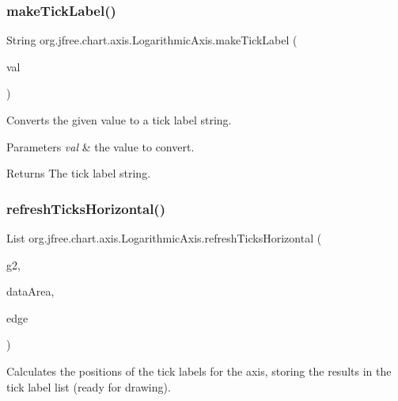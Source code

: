 \subsubsection{\texorpdfstring{make\+Tick\+Label()}{makeTickLabel()}\hspace{0.1cm}{\footnotesize\ttfamily [2/2]}}
{\footnotesize\ttfamily String org.\+jfree.\+chart.\+axis.\+Logarithmic\+Axis.\+make\+Tick\+Label (\begin{DoxyParamCaption}\item[{double}]{val }\end{DoxyParamCaption})\hspace{0.3cm}{\ttfamily [protected]}}

Converts the given value to a tick label string. 
\begin{DoxyParams}{Parameters}
{\em val} & the value to convert.\\
\hline
\end{DoxyParams}
\begin{DoxyReturn}{Returns}
The tick label string. 
\end{DoxyReturn}
\mbox{\label{classorg_1_1jfree_1_1chart_1_1axis_1_1_logarithmic_axis_ab66482bd3e0e85dc1438d309475db9d8}} 
\subsubsection{\texorpdfstring{refresh\+Ticks\+Horizontal()}{refreshTicksHorizontal()}}
{\footnotesize\ttfamily List org.\+jfree.\+chart.\+axis.\+Logarithmic\+Axis.\+refresh\+Ticks\+Horizontal (\begin{DoxyParamCaption}\item[{Graphics2D}]{g2,  }\item[{Rectangle2D}]{data\+Area,  }\item[{Rectangle\+Edge}]{edge }\end{DoxyParamCaption})\hspace{0.3cm}{\ttfamily [protected]}}

Calculates the positions of the tick labels for the axis, storing the results in the tick label list (ready for drawing).



